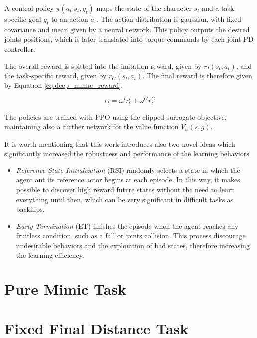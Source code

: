 A control policy $\pi (a_t|s_t,g_t)$ maps the state of the character $s_t$ and a task-specific goal $g_t$ to an action $a_t$. The action distribution is gaussian, with fixed covariance and mean given by a neural network. This policy outputs the desired joints positions, which is later translated into torque commands by each joint PD controller.

The overall reward is spitted into the imitation reward, given by $r_I(s_t,a_t)$, and the task-specific reward, given by $r_G(s_t,a_t)$. The final reward is therefore given by Equation \ref{eq:deep_mimic_reward}.

\begin{equation}
r_t = \omega^I r_t^I + \omega^G r_t^G
\label{eq:deep_mimic_reward}
\end{equation}

The policies are trained with PPO using the clipped surrogate objective, maintaining also a further network for the value function $V_{\psi}(s,g)$.

It is worth mentioning that this work introduces also two novel ideas which significantly increased the robustness and performance of the learning behaviors. 

\begin{itemize}
\item \textit{Reference State Initialization} (RSI) randomly selects a state in which the agent ant its reference actor begins at each episode. In this way, it makes possible to discover high reward future states without the need to learn everything until then, which can be very significant in difficult tasks as backflips.

\item \textit{Early Termination} (ET) finishes the episode when the agent reaches any fruitless condition, such as a fall or joints collision. This process discourage undesirable behaviors and the exploration of bad states, therefore increasing the learning efficiency.
\end{itemize}

\section{Pure Mimic Task}

\section{Fixed Final Distance Task}




